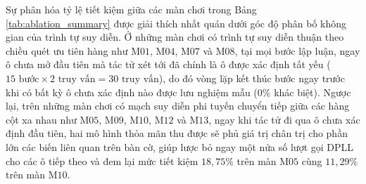 \begin{table}[H]
\centering
\caption{%
    Đối sánh định lượng hiệu quả của bộ nhớ đệm nghiệm mẫu trên các màn chơi đại
    diện}
\label{tab:ablation_summary}
\end{table}

Sự phân hóa tỷ lệ tiết kiệm giữa các màn chơi trong Bảng
\ref{tab:ablation_summary} được giải thích nhất quán dưới góc độ phân bố không gian
của trình tự suy diễn. Ở những màn chơi có trình tự suy diễn thuận theo chiều quét
ưu tiên hàng như $\text{M01}$, $\text{M04}$, $\text{M07}$ và $\text{M08}$, tại mọi
bước lập luận, ngay ô chưa mở đầu tiên mà tác tử xét tới đã chính là ô được xác
định tất yếu ($15\text{ bước} \times 2\text{ truy vấn} = 30\text{ truy vấn}$), do
đó vòng lặp kết thúc bước ngay trước khi có bất kỳ ô chưa xác định nào được lưu
nghiệm mẫu ($0\%$ khác biệt). Ngược lại, trên những màn chơi có mạch suy diễn phi
tuyến chuyển tiếp giữa các hàng cột xa nhau như $\text{M05}$, $\text{M09}$,
$\text{M10}$, $\text{M12}$ và $\text{M13}$, ngay khi tác tử đi qua ô chưa xác định
đầu tiên, hai mô hình thỏa mãn thu được sẽ phủ giá trị chân trị cho phần lớn các
biến liên quan trên bàn cờ, giúp lược bỏ ngay một nửa số lượt gọi DPLL cho các ô
tiếp theo và đem lại mức tiết kiệm $18{,}75\%$ trên màn $\text{M05}$ cùng
$11{,}29\%$ trên màn $\text{M10}$.

